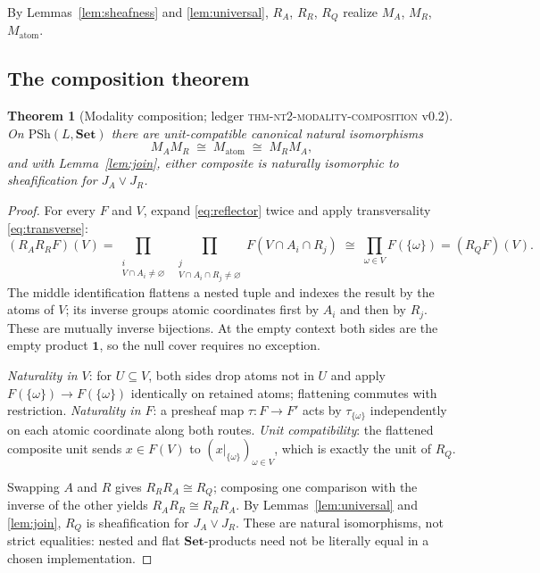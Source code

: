\documentclass[11pt]{amsart}
\newtheorem{theorem}{Theorem}[section]
\theoremstyle{definition}
\theoremstyle{remark}
\newcommand{\PSh}{\mathrm{PSh}}
\newcommand{\Set}{\mathbf{Set}}
\begin{document}
By Lemmas~\ref{lem:sheafness} and \ref{lem:universal}, $R_A$, $R_R$, $R_Q$ realize $M_A$, $M_R$, $M_{\mathrm{atom}}$.

\subsection{The composition theorem}

\begin{theorem}[Modality composition; \textnormal{ledger \textsc{thm-nt2-modality-composition} v0.2}]\label{thm:composition}
On $\PSh(L,\Set)$ there are unit-compatible canonical natural isomorphisms
\[
M_AM_R \;\cong\; M_{\mathrm{atom}} \;\cong\; M_RM_A ,
\]
and with Lemma~\textup{\ref{lem:join}}, either composite is naturally isomorphic to sheafification for $J_A\vee J_R$.
\end{theorem}

\begin{proof}
For every $F$ and $V$, expand \eqref{eq:reflector} twice and apply transversality \eqref{eq:transverse}:
\[
(R_AR_RF)(V)
=\!\!\prod_{\substack{i \\ V\cap A_i\neq\varnothing}}\ \prod_{\substack{j \\ V\cap A_i\cap R_j\neq\varnothing}}\!\! F(V\cap A_i\cap R_j)
\;\cong\;\prod_{\omega\in V}F(\{\omega\})
=(R_QF)(V).
\]
The middle identification flattens a nested tuple and indexes the result by the atoms of $V$; its inverse groups atomic coordinates first by $A_i$ and then by $R_j$. These are mutually inverse bijections. At the empty context both sides are the empty product $\mathbf{1}$, so the null cover requires no exception.

\emph{Naturality in $V$}: for $U\subseteq V$, both sides drop atoms not in $U$ and apply $F(\{\omega\})\to F(\{\omega\})$ identically on retained atoms; flattening commutes with restriction. \emph{Naturality in $F$}: a presheaf map $\tau:F\to F'$ acts by $\tau_{\{\omega\}}$ independently on each atomic coordinate along both routes. \emph{Unit compatibility}: the flattened composite unit sends $x\in F(V)$ to $(x|_{\{\omega\}})_{\omega\in V}$, which is exactly the unit of $R_Q$.

Swapping $A$ and $R$ gives $R_RR_A\cong R_Q$; composing one comparison with the inverse of the other yields $R_AR_R\cong R_RR_A$. By Lemmas~\ref{lem:universal} and \ref{lem:join}, $R_Q$ is sheafification for $J_A\vee J_R$. These are natural isomorphisms, not strict equalities: nested and flat $\Set$-products need not be literally equal in a chosen implementation.
\end{proof}
\end{document}
